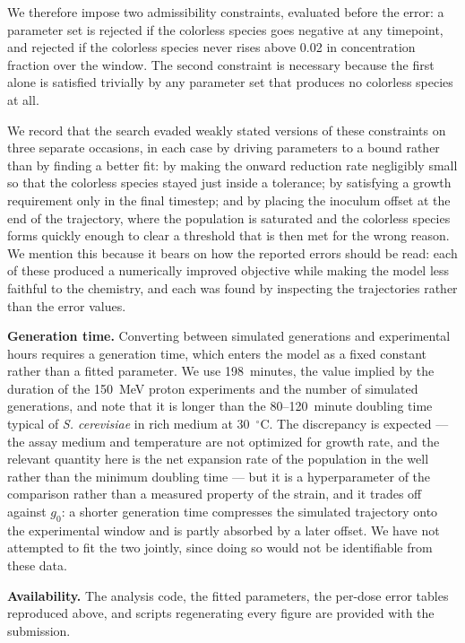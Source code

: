 \documentclass[11pt]{article}
\begin{document}
We therefore impose two admissibility constraints, evaluated before the error: a
parameter set is rejected if the colorless species goes negative at any timepoint,
and rejected if the colorless species never rises above 0.02 in concentration
fraction over the window. The second constraint is necessary because the first
alone is satisfied trivially by any parameter set that produces no colorless
species at all.

We record that the search evaded weakly stated versions of these constraints on
three separate occasions, in each case by driving parameters to a bound rather
than by finding a better fit: by making the onward reduction rate negligibly
small so that the colorless species stayed just inside a tolerance; by satisfying
a growth requirement only in the final timestep; and by placing the inoculum
offset at the end of the trajectory, where the population is saturated and the
colorless species forms quickly enough to clear a threshold that is then met for
the wrong reason. We mention this because it bears on how the reported errors
should be read: each of these produced a numerically improved objective while
making the model less faithful to the chemistry, and each was found by inspecting
the trajectories rather than the error values.

\textbf{Generation time.} Converting between simulated generations and
experimental hours requires a generation time, which enters the model as a fixed
constant rather than a fitted parameter. We use 198~minutes, the value implied by
the duration of the 150~MeV proton experiments and the number of simulated
generations, and note that it is longer than the 80--120~minute doubling time
typical of \textit{S. cerevisiae} in rich medium at 30~$^{\circ}$C. The
discrepancy is expected --- the assay medium and temperature are not optimized for
growth rate, and the relevant quantity here is the net expansion rate of the
population in the well rather than the minimum doubling time --- but it is a
hyperparameter of the comparison rather than a measured property of the strain,
and it trades off against $g_0$: a shorter generation time compresses the
simulated trajectory onto the experimental window and is partly absorbed by a
later offset. We have not attempted to fit the two jointly, since doing so would
not be identifiable from these data.

\textbf{Availability.} The analysis code, the fitted parameters, the per-dose
error tables reproduced above, and scripts regenerating every figure are provided
with the submission.
\end{document}
